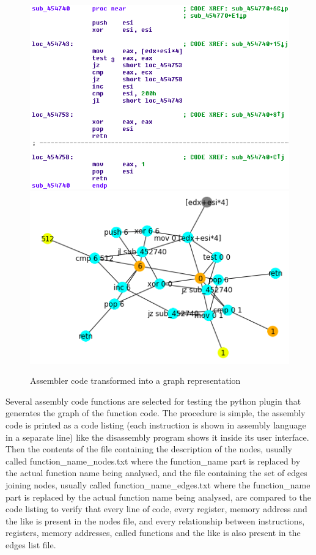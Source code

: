 \begin{appendices}
\begin{figure}[H]
%
  \centering
    \includegraphics[width=0.9\linewidth]{img/code_graph02.png}
\endminipage
{}%
  \centering
    \includegraphics[width=0.9\linewidth]{img/code_graph01.png}
\endminipage
\caption{Assembler code transformed into a graph representation}\label{fig:code_graph01}
\end{figure}




Several assembly code functions are selected for testing the python plugin that generates the graph of the function code. The procedure is simple, the assembly code is printed as a code listing (each instruction is shown in assembly language in a separate line) like the disassembly program shows it inside its user interface. Then the contents of the file containing the description of the nodes, usually called function\_name\_nodes.txt where the function\_name part is replaced by the actual function name being analysed, and the file containing the set of edges joining nodes, usually called function\_name\_edges.txt where the function\_name part is replaced by the actual function name being analysed, are compared to the code listing to verify that every line of code, every register, memory address and the like is present in the nodes file, and every relationship between instructions, registers, memory addresses, called functions and the like is also present in the edges list file.



\end{appendices}
